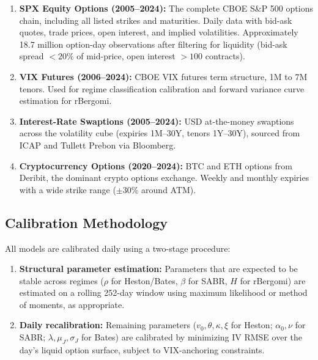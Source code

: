 \documentclass[11pt,a4paper]{article}
\theoremstyle{plain}
\theoremstyle{definition}
\theoremstyle{remark}
\begin{document}
\begin{enumerate}[label=(\Alph*), leftmargin=*]
  \item \textbf{SPX Equity Options (2005--2024):} The complete CBOE S\&P 500 options chain, including all listed strikes and maturities. Daily data with bid-ask quotes, trade prices, open interest, and implied volatilities. Approximately 18.7 million option-day observations after filtering for liquidity (bid-ask spread $< 20\%$ of mid-price, open interest $> 100$ contracts).
  \item \textbf{VIX Futures (2006--2024):} CBOE VIX futures term structure, 1M to 7M tenors. Used for regime classification calibration and forward variance curve estimation for rBergomi.
  \item \textbf{Interest-Rate Swaptions (2005--2024):} USD at-the-money swaptions across the volatility cube (expiries 1M--30Y, tenors 1Y--30Y), sourced from ICAP and Tullett Prebon via Bloomberg.
  \item \textbf{Cryptocurrency Options (2020--2024):} BTC and ETH options from Deribit, the dominant crypto options exchange. Weekly and monthly expiries with a wide strike range ($\pm 30\%$ around ATM).
\end{enumerate}

\subsection{Calibration Methodology}

All models are calibrated daily using a two-stage procedure:

\begin{enumerate}[label=Stage \arabic*, leftmargin=*]
  \item \textbf{Structural parameter estimation:} Parameters that are expected to be stable across regimes ($\rho$ for Heston/Bates, $\beta$ for SABR, $H$ for rBergomi) are estimated on a rolling 252-day window using maximum likelihood or method of moments, as appropriate.
  \item \textbf{Daily recalibration:} Remaining parameters ($v_0, \theta, \kappa, \xi$ for Heston; $\alpha_0, \nu$ for SABR; $\lambda, \mu_J, \sigma_J$ for Bates) are calibrated by minimizing IV RMSE over the day's liquid option surface, subject to VIX-anchoring constraints.
\end{enumerate}
\end{document}
